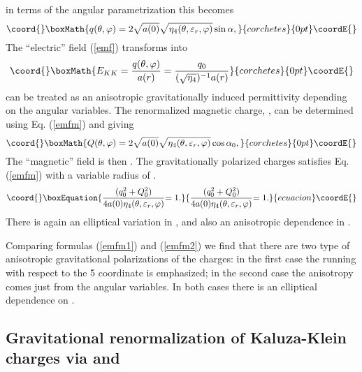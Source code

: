 \documentclass[a4paper,preprint,prabib,aps]{revtex4}
\begin{document}
in terms of the angular parametrization this becomes
\[\coord{}\boxMath{
q(\theta ,\varphi )=2\sqrt{a(0)}\sqrt{\eta _{4}(\theta ,\varepsilon
_{r},\varphi )}\sin \alpha ,
}{corchetes}{0pt}\coordE{}\]
The ``electric'' field (\ref{emf}) transforms into
\[\coord{}\boxMath{
E_{KK}=\frac{q(\theta ,\varphi )}{a(r)}=\frac{q_{0}}{(\sqrt{\eta _{4}}%
)^{-1}a(r)}
}{corchetes}{0pt}\coordE{}\]
\coordHE{} can be treated as an anisotropic gravitationally
induced permittivity depending on the angular variables. The renormalized
magnetic charge, \coordHE{}, can be determined
using Eq. (\ref{emfm}) and \coordHE{} giving
\[\coord{}\boxMath{
Q(\theta ,\varphi )=2\sqrt{a(0)}\sqrt{\eta _{4}(\theta ,\varepsilon
_{r},\varphi )}\cos \alpha _{0},
}{corchetes}{0pt}\coordE{}\]
The ``magnetic'' field is then \coordHE{}. The
gravitationally polarized charges satisfies Eq. (\ref{emfm}) with a variable
radius of \coordHE{}.
\begin{equation}\coord{}\boxEquation{
\frac{(q_{0}^{2}+Q_{0}^{2})}{4a(0)\eta _{4}(\theta ,\varepsilon _{r},\varphi
)}{=1.}  \label{emfm2}
}{
\frac{(q_{0}^{2}+Q_{0}^{2})}{4a(0)\eta _{4}(\theta ,\varepsilon _{r},\varphi
)}{=1.}  }{ecuacion}\coordE{}\end{equation}
There is again an elliptical variation in \myHighlight{$\theta $}\coordHE{}, and also an anisotropic
dependence in \myHighlight{$\varphi $}\coordHE{}.

Comparing formulas (\ref{emfm1}) and (\ref{emfm2}) we find that there are
two type of anisotropic gravitational polarizations of the charges: in the
first case the running with respect to the 5\coordHE{} coordinate is
emphasized; in the second case the anisotropy comes just from the angular
variables. In both cases there is an elliptical dependence on \myHighlight{$\theta$}\coordHE{}.

\subsection{Gravitational renormalization of Kaluza-Klein charges via \coordHE{}
and \coordHE{}}
\end{document}

